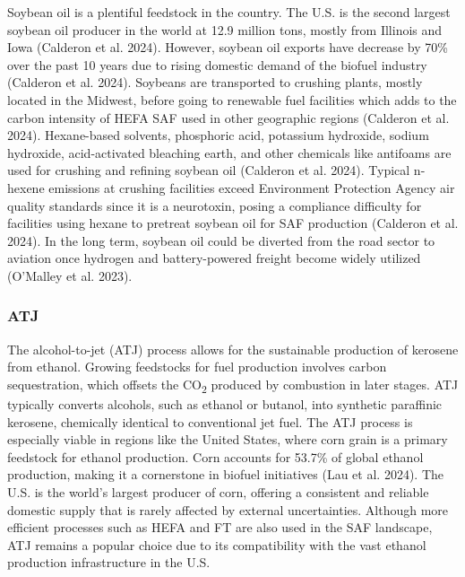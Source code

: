 \documentclass[12pt]{article}
\begin{document}
Soybean oil is a plentiful feedstock in the country. The U.S. is the second largest soybean oil producer in the world at 12.9 million tons, mostly from Illinois and Iowa (Calderon et al. 2024). However, soybean oil exports have decrease by 70\% over the past 10 years due to rising domestic demand of the biofuel industry (Calderon et al. 2024). Soybeans are transported to crushing plants, mostly located in the Midwest, before going to renewable fuel facilities which adds to the carbon intensity of HEFA SAF used in other geographic regions (Calderon et al. 2024). Hexane-based solvents, phosphoric acid, potassium hydroxide, sodium hydroxide, acid-activated bleaching earth, and other chemicals like antifoams are used for crushing and refining soybean oil (Calderon et al. 2024). Typical n-hexene emissions at crushing facilities exceed Environment Protection Agency air quality standards since it is a neurotoxin, posing a compliance difficulty for facilities using hexane to pretreat soybean oil for SAF production (Calderon et al. 2024). In the long term, soybean oil could be diverted from the road sector to aviation once hydrogen and battery-powered freight become widely utilized (O’Malley et al. 2023). 


\subsubsection{ATJ}

The alcohol-to-jet (ATJ) process allows for the sustainable production of kerosene from ethanol. Growing feedstocks for fuel production involves carbon sequestration, which offsets the CO\textsubscript{2} produced by combustion in later stages. ATJ typically converts alcohols, such as ethanol or butanol, into synthetic paraffinic kerosene, chemically identical to conventional jet fuel. The ATJ process is especially viable in regions like the United States, where corn grain is a primary feedstock for ethanol production. Corn accounts for 53.7\% of global ethanol production, making it a cornerstone in biofuel initiatives (Lau et al. 2024). The U.S. is the world’s largest producer of corn, offering a consistent and reliable domestic supply that is rarely affected by external uncertainties. Although more efficient processes such as HEFA and FT are also used in the SAF landscape, ATJ remains a popular choice due to its compatibility with the vast ethanol production infrastructure in the U.S. 
 
\end{document}
